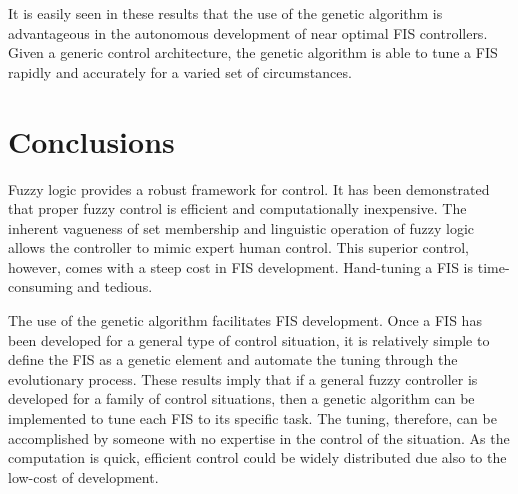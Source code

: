 It is easily seen in these results that the use of the genetic algorithm is advantageous in the autonomous
development of near optimal FIS controllers. Given a generic control architecture, the genetic algorithm is
able to tune a FIS rapidly and accurately for a varied set of circumstances.

\section{Conclusions} Fuzzy logic provides a robust framework for control. It has
been demonstrated that proper fuzzy control is efficient and computationally inexpensive. The inherent
vagueness of set membership and linguistic operation of fuzzy logic allows the controller to mimic expert
human control. This superior control, however, comes with a steep cost in FIS development. Hand-tuning a FIS
is time-consuming and tedious.


The use of the genetic algorithm facilitates FIS development. Once a FIS has been developed for a general type
of control situation, it is relatively simple to define the FIS as a genetic element and automate the tuning
through the evolutionary process. These results imply that if a general fuzzy controller is developed for a
family of control situations, then a genetic algorithm can be implemented to tune each FIS to its specific
task. The tuning, therefore, can be accomplished by someone with no expertise in the control of the situation.
As the computation is quick, efficient control could be widely distributed due also to the low-cost of
development.


